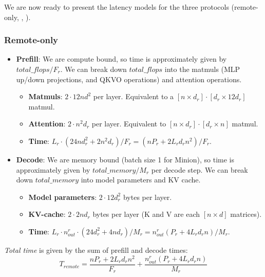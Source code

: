 
We are now ready to present the latency models for the three protocols (remote-only, \naive, \system).

\subsubsection{Remote-only}
\begin{itemize}
    \item \textbf{Prefill}: We are compute bound, so time is approximately given by $total\_flops / F_r$.
    We can break down $total\_flops$ into the matmuls (MLP up/down projections, and QKVO operations) and attention operations.
    \begin{itemize}
        \item \textbf{Matmuls}: $2 \cdot 12 n d^2$ per layer. 
        Equivalent to a $[n \times d_r] \cdot [d_r \times 12d_r]$ matmul.
        \item \textbf{Attention}: $2 \cdot n^2 d_r$ per layer.
        Equivalent to $[n \times d_r] \cdot [d_r \times n]$ matmul.
        \item \textbf{Time}: $L_r \cdot (24 n d_r^2 + 2 n^2 d_r) / F_r = (nP_r + 2 L_r d_r n^2) / F_r$.
    \end{itemize}
    \item \textbf{Decode}: We are memory bound (batch size 1 for Minion), so time is approximately given by $total\_memory / M_r$ per decode step.
    We can break down $total\_memory$ into model parameters and KV cache.
    \begin{itemize}
        \item \textbf{Model parameters}: $2 \cdot 12 d_r^2$ bytes per layer.
        \item \textbf{KV-cache}: $2 \cdot 2 n d_r$ bytes per layer (K and V are each  $[n \times d]$ matrices).
        \item \textbf{Time}: $L_r \cdot n_{out}^r \cdot (24 d_r^2 + 4 n d_r) / M_r =  n_{out}^r (P_r + 4 L_r d_r n) / M_r$.
    \end{itemize}
\end{itemize}
\noindent \textit{Total time} is given by the sum of prefill and decode times: 
    $$T_{remote} = \frac{nP_r + 2 L_r d_r n^2}{F_r} + \frac{n_{out}^r (P_r + 4 L_r d_r n )}{M_r}$$



